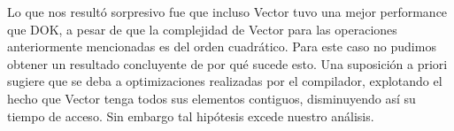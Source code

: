 Lo que nos resultó sorpresivo fue que incluso Vector tuvo una mejor performance que DOK, a pesar de que la complejidad de Vector para las operaciones anteriormente mencionadas es del orden cuadrático. Para este caso no pudimos obtener un resultado concluyente de por qué sucede esto. Una suposición a priori sugiere que se deba a optimizaciones realizadas por el compilador, explotando el hecho que Vector tenga todos sus elementos contiguos, disminuyendo así su tiempo de acceso. Sin embargo tal hipótesis excede nuestro análisis.

